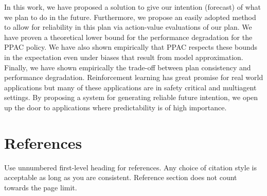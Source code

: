 \documentclass{article}
\begin{document}
        In this work, we have proposed a solution to give our intention (forecast) of what we plan to do in the future. Furthermore, we propose an easily adopted method to allow for reliability in this plan via action-value evaluations of our plan. We have proven a theoretical lower bound for the performance degradation for the PPAC policy. We have also shown empirically that PPAC respects these bounds in the expectation even under biases that result from model approximation. Finally, we have shown empirically the trade-off between plan consistency and performance degradation. Reinforcement learning has great promise for real world applications but many of these applications are in safety critical and multiagent settings. By proposing a system for generating reliable future intention, we open up the door to applications where predictability is of high importance.

            


    \section*{References}
        Use unnumbered first-level heading for references.
        Any choice of citation style is acceptable as long as you are consistent.
        Reference section does not count towards the page limit.
    \medskip
    
    



\end{document}
